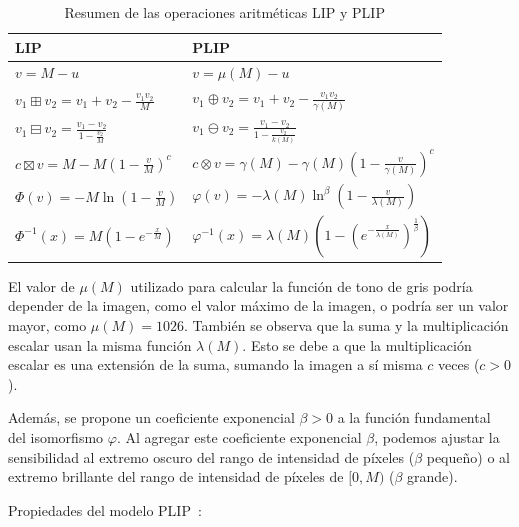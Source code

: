 \begin{table}
	\caption{Resumen de las operaciones aritm\'eticas LIP y PLIP}
	\begin{center}
		\begin{tabular}{|l|l|}
			\hline 
			\textbf{LIP} & \textbf{PLIP}\\
			\hline
			$v=M-u$ & $v=\mu(M)-u$\\
			\hline
			$v_1\boxplus v_2=v_1+v_2-\frac{v_1v_2}{M}$ & $v_1\oplus v_2=v_1+v_2-\frac{v_1v_2}{\gamma(M)}$\\
			\hline
			$v_1\boxminus v_2=\frac{v_1-v_2}{1-\frac{v_2}{M}}$ & $v_1\ominus v_2=\frac{v_1-v_2}{1-\frac{v_2}{k(M)}}$\\
			\hline
			$c\boxtimes v=M-M(1-\frac{v}{M})^c$ & $c\otimes v=\gamma(M)-\gamma(M)(1-\frac{v}{\gamma(M)})^c$\\
			\hline
			$\varPhi(v)=-M\ln(1-\frac{v}{M})$ & $\varphi(v)=-\lambda(M)\ln^\beta(1-\frac{v}{\lambda(M)})$\\
			\hline
			$\varPhi^{-1}(x)=M\left(1-e^{-\frac{x}{M}}\right)$ & $\varphi^{-1}(x)=\lambda(M)\left(1-\left(e^{-\frac{x}{\lambda(M)}}\right)^{\frac{1}{\beta}}\right)$\\
			\hline
		\end{tabular}
	\end{center}
\end{table}

El valor de $\mu(M)$ utilizado para calcular la función de tono de gris podría depender de la imagen, como el valor máximo de la imagen, o podría ser un valor mayor, como $\mu(M) = 1026$. También se observa que la suma y la multiplicación escalar usan la misma función $\lambda(M)$. Esto se debe a que la multiplicación escalar es una extensión de la suma, sumando la imagen a sí misma $c$ veces ($c>0$).

Además, se propone un coeficiente exponencial $\beta>0$ a la función fundamental del isomorfismo $\varphi$. Al agregar este coeficiente exponencial $\beta$, podemos ajustar la sensibilidad al extremo oscuro del rango de intensidad de píxeles ($\beta$ pequeño) o al extremo brillante del rango de intensidad de píxeles de $[0, M)$ ($\beta$ grande).

Propiedades del modelo PLIP~\cite{panetta2010parameterized}:

